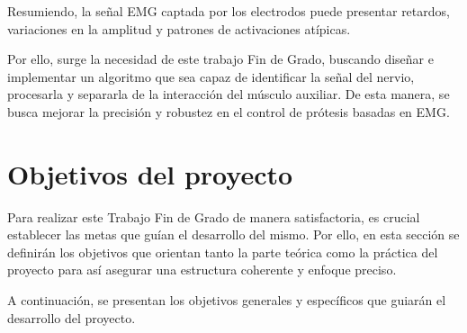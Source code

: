 \documentclass[12pt, a4paper]{article}
\let\chapter\section
\begin{document}
Resumiendo, la señal EMG captada por los electrodos puede presentar retardos, variaciones en la amplitud y patrones de activaciones atípicas.


Por ello, surge la necesidad de este trabajo Fin de Grado, buscando diseñar e implementar un algoritmo que sea capaz de identificar la señal del nervio, procesarla y separarla de la interacción del músculo auxiliar. De esta manera, se busca mejorar la precisión y robustez en el control de prótesis basadas en EMG.
\clearpage
\chapter{Objetivos del proyecto}
Para realizar este Trabajo Fin de Grado de manera satisfactoria, es crucial establecer las metas que guían el desarrollo del mismo. Por ello, en esta sección se definirán los objetivos que orientan tanto la parte teórica como la práctica del proyecto para así asegurar una estructura coherente y enfoque preciso.

A continuación, se presentan los objetivos generales y específicos que guiarán el desarrollo del proyecto.
\end{document}
